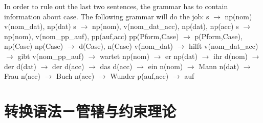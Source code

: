 \begin{enumerate}
In order to rule out the last two sentences, the grammar has to contain information about case. The following grammar will do the job:
\eal
\ex s $\to$ np(nom) v(nom\_dat), np(dat)
\ex s $\to$ np(nom), v(nom\_dat\_acc), np(dat), np(acc)
\ex s $\to$ np(nom), v(nom\_pp\_auf), pp(auf,acc)
\ex pp(Pform,Case) $\to$ p(Pform,Case), np(Case)
\ex np(Case) $\to$ d(Case), n(Case)
\ex v(nom\_dat) $\to$ hilft
\ex v(nom\_dat\_acc) $\to$ gibt
\ex v(nom\_pp\_auf) $\to$ wartet
\ex np(nom) $\to$ er
\ex np(dat) $\to$ ihr
\ex d(nom) $\to$ der
\ex d(dat) $\to$ der
\ex d(acc) $\to$ das
\ex d(acc) $\to$ ein
\ex n(nom) $\to$ Mann
\ex n(dat) $\to$ Frau
\ex n(acc) $\to$ Buch
\ex n(acc) $\to$ Wunder
\ex p(auf,acc) $\to$ auf
\zl

\end{enumerate}



\section{转换语法－管辖与约束理论}


\begin{figure}[H]
\centering
\scalebox{.9}{%
\begin{forest}
sn edges
[CP
[C$'$
	[C$^0$[dass;CONJ]]
	[IP
		[NP [die Frau;这个女人,roof]]
		[I$'$
			[VP
				[V$'$
					[NP[den Mann;这个男人, roof]]
					[V$^0$[\trace$_j$]]]]
			[I$^0$[lieb-$_j$ -t;爱- -s]]]]]]
\end{forest}
}
\hfill
\scalebox{.9}{
\begin{forest}
sn edges
[CP
[C$'$
	[C$^0$[dass;CONJ]]
        [IP
           [NP, [der Mann$_i$;这个男人 ,roof]]
        [I$'$
	   [VP
		[V$'$
	           [NP,   [\_$_i$]]
		   [V$^0$,[geliebt \trace$_j$;被爱, roof]]]]
	   [I$^0$ ,name=Infl [wir-$_j$ -d;is]]]]]]
\end{forest}
}
\end{figure}%


